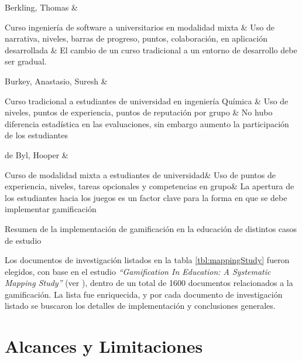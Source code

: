 {        Berkling, Thomas \cite{gamificationFailure} &

            Curso ingeniería de software a universitarios en modalidad mixta &
            Uso de narrativa, niveles, barras de progreso, puntos, colaboración,
            en aplicación desarrollada &
            El cambio de un curso tradicional a un entorno de desarrollo
            debe ser gradual.\\\hline


        Burkey, Anastasio, Suresh \cite{gamificationChemical} &

            Curso tradicional a estudiantes de universidad en ingeniería Química &
            Uso de niveles, puntos de experiencia, puntos de reputación por grupo &
            No hubo diferencia estadística en las evaluaciones, sin embargo aumento la participación de los estudiantes\\\hline


        de Byl, Hooper \cite{gamifiedLearningKeyAttributes} &

            Curso de modalidad mixta a estudiantes de universidad&
            Uso de puntos de experiencia, niveles, tareas opcionales
            y competencias en grupo&
            La apertura de los estudiantes hacia los juegos es un factor
            clave para la forma en que se debe implementar gamificación\\\hline


    }{Resumen de la implementación de gamificación en la educación
      de distintos casos de estudio}

 \noindent Los documentos de investigación listados en la tabla \ref{tbl:mappingStudy}
 fueron elegidos, con base en el estudio {\em ``Gamification In Education: A
 Systematic Mapping Study''} (ver \cite{mappingStudy}), dentro de un total de 1600
 documentos relacionados a la gamificación. La lista fue enriquecida, y por cada
 documento de investigación listado se buscaron los detalles de implementación y
 conclusiones generales.

\section{Alcances y Limitaciones} \label{sec:alcancesLimitaciones}

